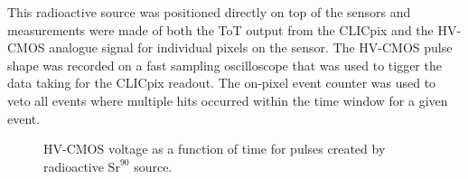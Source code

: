 This radioactive source was positioned directly on top of the sensors and measurements were made of both the ToT output from the CLICpix and the HV-CMOS analogue signal for individual pixels on the sensor.  The HV-CMOS pulse shape was recorded on a fast sampling oscilloscope that was used to tigger the data taking for the CLICpix readout.  The on-pixel event counter was used to veto all events where multiple hits occurred within the time window for a given event.  

\begin{figure}
\centering
{}
\hfill
{}
\caption[HV-CMOS voltage as a function of time for pulses created by radioactive strontium 90 source.]{HV-CMOS voltage as a function of time for pulses created by radioactive $\text{Sr}^{90}$ source.}
\label{fig:pulseshapes}
\end{figure}

